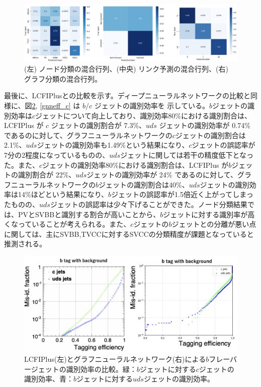 \begin{figure}[H]
	\begin{center}
 \includegraphics[keepaspectratio, scale=0.3]
 	{Figure/Flavortagging/gnncm.png}
 		\caption[グラフ学習結果の混合行列]{(左) ノード分類の混合行列、(中央) リンク予測の混合行列、(右) グラフ分類の混合行列。}
 		\label{gnncm}
	\end{center}
\end{figure}
最後に、LCFIPlusとの比較を示す。ディープニューラルネットワークの比較と同様に、図\ref{gnneff_b}, \ref{gnneff_c} は $b/c$ ジェットの識別効率を
示している。$b$ジェットの識別効率は$c$ジェットについて向上しており、識別効率80\%における識別割合は、LCFIPlus が $c$ ジェットの識別割合が 7.3\%、$uds$ ジェットの識別効率が 0.74\% であるのに対して、グラフニューラルネットワークの$c$ジェットの識別割合は2.1\%、$uds$ジェットの識別効率も1.49\%という結果になり、$c$ジェットの誤認率が7分の2程度になっているものの、$uds$ジェットに関しては若干の精度低下となった。また、$c$ジェットの識別効率80\%における識別割合は、LCFIPlus が$b$ジェットの識別割合が 22\%、$uds$ジェットの識別効率が 24\% であるのに対して、グラフニューラルネットワークの$b$ジェットの識別割合は40\%、$uds$ジェットの識別効率は14\%ほどという結果になり、$b$ジェットの誤認率が1.5倍近く上がってしまったものの、$uds$ジェットの誤認率は少々下げることができた。ノード分類結果では、PVとSVBBと識別する割合が高いことから、$b$ジェットに対する識別率が高くなっていることが考えられる。また、$c$ジェットの$b$ジェットとの分離が悪い点に関しては、主にSVBB,TVCCに対するSVCCの分類精度が課題となっていると推測される。

\begin{figure}[H]
	\begin{center}
 \includegraphics[keepaspectratio, scale=0.33]
 	{Figure/Flavortagging/gnneff_b.png}
 		\caption[LCFIPlusとGATのb-tagに関する比較]{LCFIPlus(左)とグラフニューラルネットワーク(右)による$b$フレーバージェットの識別効率の比較。緑：$b$ジェットに対する$c$ジェットの識別効率、青：$b$ジェットに対する$uds$ジェットの識別効率。}
 		\label{gnneff_b}
	\end{center}
\end{figure}

